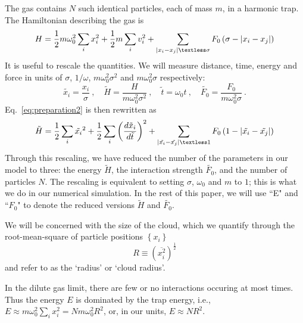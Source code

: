 \documentclass[aps,preprintnumbers,onecolumn,amsmath,amssymb,floatfix,pra]{revtex4-1}
\begin{document}
The gas contains $N$ such identical particles, each of mass $m$, in a harmonic trap.  The
Hamiltonian describing the gas is 
\begin{equation}
H=\frac{1}{2}m\omega_0^2\sum_{i}x_i^2+\frac{1}{2}m\sum_i
v_i^2+\sum_{\left|x_i-x_j\right|\textless\sigma}F_0\left(\sigma-\left|x_i-x_j\right|\right)
\label{eq:preparation2}
\end{equation}
%
It is useful to rescale the quantities.  We will measure distance, time, energy and force in units
of $\sigma$, $1/\omega$, $m\omega_0^2\sigma^2$ and $m\omega_0^2\sigma$ respectively:
\begin{equation} \label{eq:transform}
  \tilde{x_i} = \frac{x_i}{\sigma}\ , \quad 
  \tilde{H} = \frac{H}{m\omega_0^2\sigma^2}\ ,  \quad \tilde{t} = \omega_0t \ ,  \quad 
\tilde{F_0} = \frac{F_0}{m\omega_0^2\sigma}\ .
\end{equation}
%
Eq.~\ref{eq:preparation2} is then rewritten as
\begin{equation}
\tilde{H}=\frac{1}{2}\sum_{i}\tilde{x_i}^2+\frac{1}{2}\sum_i\left(\frac{d\tilde{x}_i}{d\tilde{t}}\right)^2+\sum_{\left|\tilde{x_i}-\tilde{x_j}\right|\textless 1}F_0\left(1-\left|\tilde{x_i}-\tilde{x_j}\right|\right)
\end{equation}
%
Through this rescaling, we have reduced the number of the parameters in our model to three: the
energy $\tilde{H}$, the interaction strength $\tilde{F_0}$, and the number of particles $N$.  The
rescaling is equivalent to setting $\sigma$, $\omega_0$ and $m$ to $1$; this is what we do in our
numerical simulation.  In the rest of this paper, we will use ``E" and ``$F_0$" to denote the
reduced versions $\tilde{H}$ and $\tilde{F_0}$.

We will be concerned with the size of the cloud, which we quantify through the root-mean-square of
particle positions  $\left\lbrace x_i\right\rbrace$
\begin{equation}
R\equiv\left(\overline{x_i^2}\right)^\frac{1}{2}
\label{eq:def_of_R}
\end{equation}
and refer to as the `radius' or `cloud radius'. 

In the dilute gas limit, there are few or no interactions occuring at most times.  Thus the energy
$E$ is dominated by the trap energy, i.e., $E\approx m\omega_0^2\sum_{i}x_i^2= Nm\omega_0^2R^2$, or,
in our units, $E\approx NR^2$.  
\end{document}
